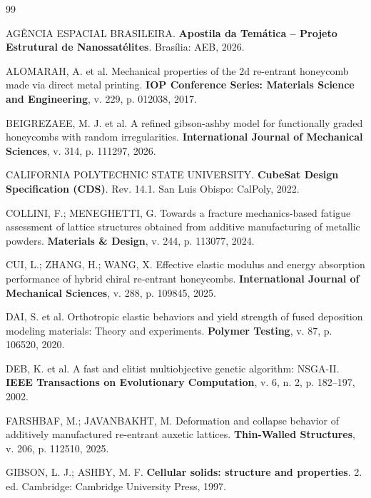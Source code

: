 \documentclass[12pt,a4paper]{report}
\begin{document}
\clearpage
\begin{thebibliography}{99}

AGÊNCIA ESPACIAL BRASILEIRA. \textbf{Apostila da Temática -- Projeto Estrutural de Nanossatélites}. Brasília: AEB, 2026.

ALOMARAH, A. et al. Mechanical properties of the 2d re-entrant honeycomb made via direct metal printing. \textbf{IOP Conference Series: Materials Science and Engineering}, v. 229, p. 012038, 2017.

BEIGREZAEE, M. J. et al. A refined gibson-ashby model for functionally graded honeycombs with random irregularities. \textbf{International Journal of Mechanical Sciences}, v. 314, p. 111297, 2026.

CALIFORNIA POLYTECHNIC STATE UNIVERSITY. \textbf{CubeSat Design Specification (CDS)}. Rev. 14.1. San Luis Obispo: CalPoly, 2022.

COLLINI, F.; MENEGHETTI, G. Towards a fracture mechanics-based fatigue assessment of lattice structures obtained from additive manufacturing of metallic powders. \textbf{Materials \& Design}, v. 244, p. 113077, 2024.

CUI, L.; ZHANG, H.; WANG, X. Effective elastic modulus and energy absorption performance of hybrid chiral re-entrant honeycombs. \textbf{International Journal of Mechanical Sciences}, v. 288, p. 109845, 2025.

DAI, S. et al. Orthotropic elastic behaviors and yield strength of fused deposition modeling materials: Theory and experiments. \textbf{Polymer Testing}, v. 87, p. 106520, 2020.

DEB, K. et al. A fast and elitist multiobjective genetic algorithm: NSGA-II. \textbf{IEEE Transactions on Evolutionary Computation}, v. 6, n. 2, p. 182--197, 2002.

FARSHBAF, M.; JAVANBAKHT, M. Deformation and collapse behavior of additively manufactured re-entrant auxetic lattices. \textbf{Thin-Walled Structures}, v. 206, p. 112510, 2025.

GIBSON, L. J.; ASHBY, M. F. \textbf{Cellular solids: structure and properties}. 2. ed. Cambridge: Cambridge University Press, 1997.


\end{thebibliography}
\end{document}
